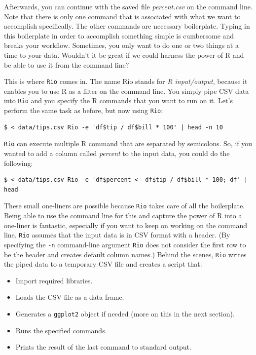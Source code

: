 \documentclass[
]{book}
\theoremstyle{definition}
\theoremstyle{definition}
\theoremstyle{definition}
\theoremstyle{remark}
\begin{document}
Afterwards, you can continue with the saved file \emph{percent.csv} on the command line. Note that there is only one command that is associated with what we want to accomplish specifically. The other commands are necessary boilerplate. Typing in this boilerplate in order to accomplish something simple is cumbersome and breaks your workflow. Sometimes, you only want to do one or two things at a time to your data. Wouldn't it be great if we could harness the power of R and be able to use it from the command line?

This is where \texttt{Rio} comes in. The name Rio stands for \emph{R input/output}, because it enables you to use R as a filter on the command line. You simply pipe CSV data into \texttt{Rio} and you specify the R commands that you want to run on it. Let's perform the same task as before, but now using \texttt{Rio}:

\begin{verbatim}
$ < data/tips.csv Rio -e 'df$tip / df$bill * 100' | head -n 10
\end{verbatim}

\texttt{Rio} can execute multiple R command that are separated by semicolons. So, if you wanted to add a column called \emph{percent} to the input data, you could do the following:

\begin{verbatim}
$ < data/tips.csv Rio -e 'df$percent <- df$tip / df$bill * 100; df' | head
\end{verbatim}

These small one-liners are possible because \texttt{Rio} takes care of all the boilerplate. Being able to use the command line for this and capture the power of R into a one-liner is fantastic, especially if you want to keep on working on the command line. \texttt{Rio} assumes that the input data is in CSV format with a header. (By specifying the \texttt{-n} command-line argument \texttt{Rio} does not consider the first row to be the header and creates default column names.) Behind the scenes, \texttt{Rio} writes the piped data to a temporary CSV file and creates a script that:

\begin{itemize}
\item
  Import required libraries.
\item
  Loads the CSV file as a data frame.
\item
  Generates a \texttt{ggplot2} object if needed (more on this in the next section).
\item
  Runs the specified commands.
\item
  Prints the result of the last command to standard output.
\end{itemize}
\end{document}
